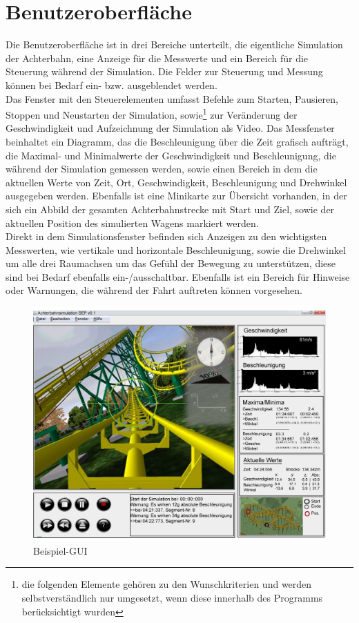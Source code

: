
\chapter{Benutzeroberfläche}

Die Benutzeroberfläche ist in drei Bereiche unterteilt, die eigentliche Simulation der Achterbahn, eine Anzeige für die Messwerte und ein Bereich für die Steuerung während der Simulation. Die Felder zur Steuerung und Messung können bei Bedarf ein- bzw. ausgeblendet werden.\\
Das Fenster mit den Steuerelementen umfasst Befehle zum Starten, Pausieren, Stoppen und Neustarten der Simulation, sowie\footnote{die folgenden Elemente gehören zu den Wunschkriterien und werden selbstverständlich nur umgesetzt, wenn diese innerhalb des Programms berücksichtigt wurden} zur Veränderung der Geschwindigkeit und Aufzeichnung der Simulation als Video.
Das Messfenster beinhaltet ein Diagramm, das die Beschleunigung über die Zeit grafisch aufträgt, die Maximal- und Minimalwerte der Geschwindigkeit und Beschleunigung, die während der Simulation gemessen werden, sowie einen Bereich in dem die aktuellen Werte von Zeit, Ort, Geschwindigkeit, Beschleunigung und Drehwinkel ausgegeben werden.
Ebenfalls ist eine Minikarte zur Übersicht vorhanden, in der sich ein Abbild der gesamten Achterbahnstrecke mit Start und Ziel, sowie der aktuellen Position des simulierten Wagens markiert werden.\\
Direkt in dem Simulationsfenster befinden sich Anzeigen zu den wichtigsten Messwerten, wie vertikale und horizontale Beschleunigung, sowie die Drehwinkel um alle drei Raumachsen um das Gefühl der Bewegung zu unterstützen, diese sind bei Bedarf ebenfalls ein-/ausschaltbar. Ebenfalls ist ein Bereich für Hinweise oder Warnungen, die während der Fahrt auftreten können vorgesehen. 
\begin{figure}[!h]%
\includegraphics[width=0.8\linewidth]{../bilder/GUI_v2.jpg}%
\caption{Beispiel-GUI}%
\label{}%
\end{figure}